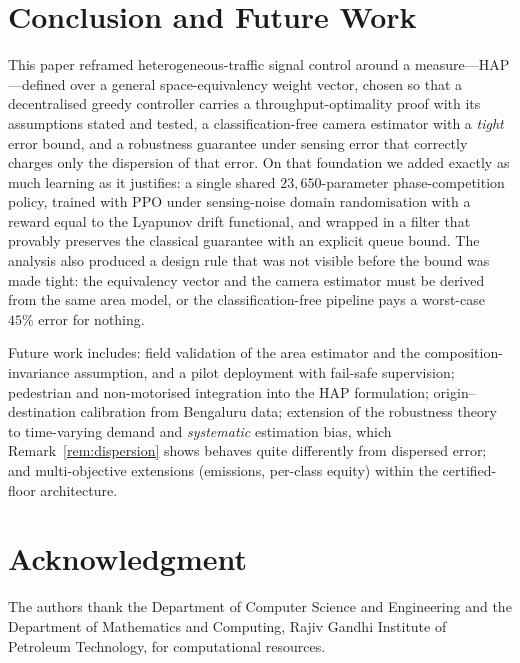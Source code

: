\documentclass[journal]{IEEEtran}
\begin{document}
\section{Conclusion and Future Work}
\label{sec:conclusion}
This paper reframed heterogeneous-traffic signal control around a
measure---HAP---defined over a general space-equivalency weight vector,
chosen so that a decentralised greedy controller carries a
throughput-optimality proof with its assumptions stated and tested, a
classification-free camera estimator with a \emph{tight} error bound, and
a robustness guarantee under sensing error that correctly charges only
the dispersion of that error. On that foundation we added exactly as much
learning as it justifies: a single shared $23{,}650$-parameter
phase-competition policy, trained with PPO under sensing-noise domain
randomisation with a reward equal to the Lyapunov drift functional, and
wrapped in a filter that provably preserves the classical guarantee with
an explicit queue bound. The analysis also produced a design rule that
was not visible before the bound was made tight: the equivalency vector
and the camera estimator must be derived from the same area model, or the
classification-free pipeline pays a worst-case $45\%$ error for nothing.

Future work includes: field validation of the area estimator and the
composition-invariance assumption, and a pilot deployment with fail-safe
supervision; pedestrian and non-motorised integration into the HAP
formulation; origin--destination calibration from Bengaluru data;
extension of the robustness theory to time-varying demand and
\emph{systematic} estimation bias, which Remark~\ref{rem:dispersion}
shows behaves quite differently from dispersed error; and multi-objective
extensions (emissions, per-class equity) within the certified-floor
architecture.

\section*{Acknowledgment}
The authors thank the Department of Computer Science and Engineering and
the Department of Mathematics and Computing, Rajiv Gandhi Institute of
Petroleum Technology, for computational resources.

\appendices
\end{document}
